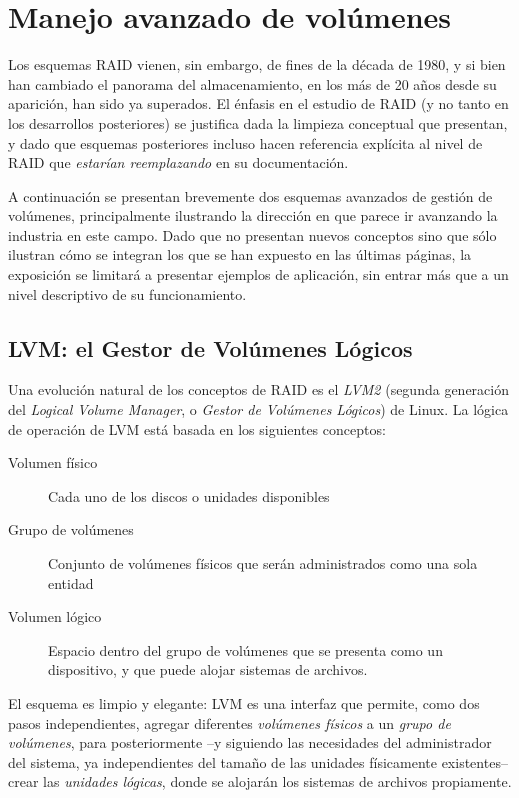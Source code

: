 \documentclass[11pt,fleqn]{book} %
\begin{document}
\section{Manejo avanzado de volúmenes}
\label{sec-10-3}
\label{FS_FIS_man_av_vol}


Los esquemas RAID vienen, sin embargo, de fines de la década de 1980,
y si bien han cambiado el panorama del almacenamiento, en los más de
20 años desde su aparición, han sido ya superados. El énfasis en el
estudio de RAID (y no tanto en los desarrollos posteriores) se
justifica dada la limpieza conceptual que presentan, y dado que
esquemas posteriores incluso hacen referencia explícita al nivel de
RAID que \emph{estarían reemplazando} en su documentación.

A continuación se presentan brevemente dos esquemas avanzados de
gestión de volúmenes, principalmente ilustrando la dirección en que
parece ir avanzando la industria en este campo. Dado que no presentan
nuevos conceptos sino que sólo ilustran cómo se integran los que se
han expuesto en las últimas páginas, la exposición se limitará a
presentar ejemplos de aplicación, sin entrar más que a un nivel
descriptivo de su funcionamiento.
\subsection{LVM: el Gestor de Volúmenes Lógicos}
\label{sec-10-3-1}


Una evolución natural de los conceptos de RAID es el \emph{LVM2} (segunda
generación del \emph{Logical Volume Manager}, o \emph{Gestor de Volúmenes Lógicos}) de Linux. La lógica de operación de LVM está basada en los
siguientes conceptos:

\begin{description}
\item[Volumen físico] Cada uno de los discos o unidades disponibles
\item[Grupo de volúmenes] Conjunto de volúmenes físicos que serán
     administrados como una sola entidad
\item[Volumen lógico] Espacio dentro del grupo de volúmenes que se presenta
		    como un dispositivo, y que puede alojar sistemas
                    de archivos.
\end{description}

El esquema es limpio y elegante: LVM es una interfaz que permite, como
dos pasos independientes, agregar diferentes \emph{volúmenes físicos} a un
\emph{grupo de volúmenes}, para posteriormente –y siguiendo las necesidades
del administrador del sistema, ya independientes del tamaño de las
unidades físicamente existentes– crear las \emph{unidades lógicas}, donde
se alojarán los sistemas de archivos propiamente.
\end{document}
